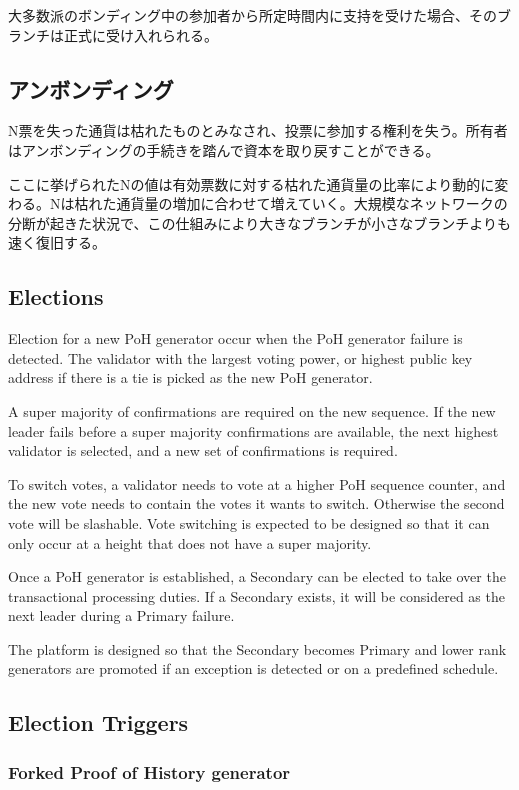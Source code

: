 \documentclass[12pt]{ltjsarticle}
\begin{document}
大多数派のボンディング中の参加者から所定時間内に支持を受けた場合、そのブランチは正式に受け入れられる。

\subsection{アンボンディング}

N票を失った通貨は枯れたものとみなされ、投票に参加する権利を失う。所有者はアンボンディングの手続きを踏んで資本を取り戻すことができる。

ここに挙げられたNの値は有効票数に対する枯れた通貨量の比率により動的に変わる。Nは枯れた通貨量の増加に合わせて増えていく。大規模なネットワークの分断が起きた状況で、この仕組みにより大きなブランチが小さなブランチよりも速く復旧する。

\subsection{Elections}\label{subsec:elections}
Election for a new PoH generator occur when the PoH generator failure is detected. The validator with the largest voting power, or highest public key address if there is a tie is picked as the new PoH generator.

A super majority of confirmations are required on the new sequence. If the new leader fails before a super majority confirmations are available, the next highest validator is selected, and a new set of confirmations is required.

To switch votes, a validator needs to vote at a higher PoH sequence counter, and the new vote needs to contain the votes it wants to switch. Otherwise the second vote will be slashable. Vote switching is expected to be designed so that it can only occur at a height that does not have a super majority.

Once a PoH generator is established, a Secondary can be elected to take over the transactional processing duties. If a Secondary exists, it will be considered as the next leader during a Primary failure.

The platform is designed so that the Secondary becomes Primary and lower rank generators are promoted if an exception is detected or on a predefined schedule.
\subsection{Election Triggers}
\subsubsection{Forked Proof of History generator}
\end{document}
